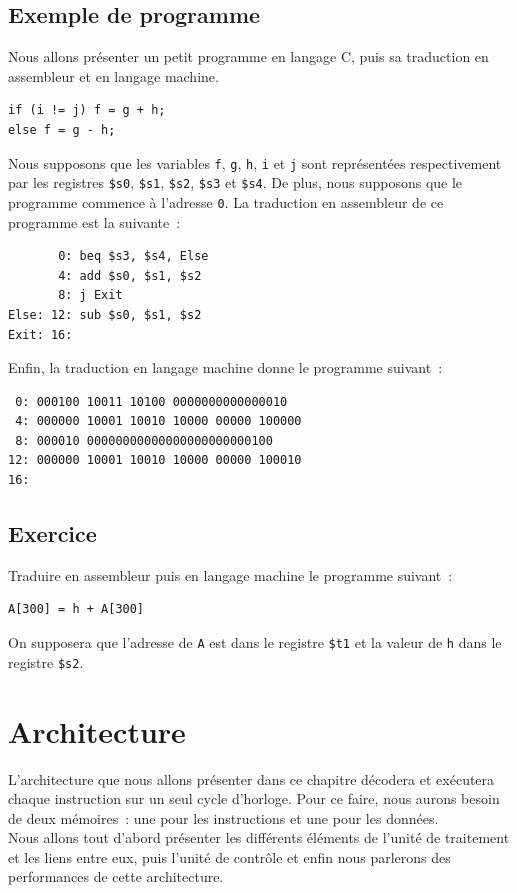 \documentclass[12pt]{article}
\begin{document}
\subsection{Exemple de programme}

Nous allons présenter un petit programme en langage C, puis sa traduction en assembleur et en langage machine.
\begin{verbatim}
if (i != j) f = g + h;
else f = g - h;
\end{verbatim}

Nous supposons que les variables \verb+f+, \verb+g+, \verb+h+, \verb+i+ et \verb+j+ sont représentées respectivement par les registres
\verb+$s0+, \verb+$s1+, \verb+$s2+, \verb+$s3+ et \verb+$s4+. De plus, nous supposons que le programme commence à l'adresse \verb+0+.
La traduction en assembleur de ce programme est la suivante~:

\begin{verbatim}
       0: beq $s3, $s4, Else
       4: add $s0, $s1, $s2
       8: j Exit
Else: 12: sub $s0, $s1, $s2
Exit: 16:
\end{verbatim}

Enfin, la traduction en langage machine donne le programme suivant~:

\begin{verbatim}
 0: 000100 10011 10100 0000000000000010
 4: 000000 10001 10010 10000 00000 100000
 8: 000010 00000000000000000000000100
12: 000000 10001 10010 10000 00000 100010
16:
\end{verbatim}

\subsection{Exercice}

Traduire en assembleur puis en langage machine le programme suivant~:

\begin{verbatim}
A[300] = h + A[300]
\end{verbatim}

On supposera que l'adresse de \verb+A+ est dans le registre \verb+$t1+ et la valeur de \verb+h+ dans le registre \verb+$s2+.

\section{Architecture}

L'architecture que nous allons présenter dans ce chapitre décodera et exécutera chaque instruction sur un seul cycle d'horloge. Pour ce
faire, nous aurons besoin de deux mémoires~: une pour les instructions et une pour les données.\\
Nous allons tout d'abord présenter les différents éléments de l'unité de traitement et les liens entre eux, puis l'unité de contrôle et
enfin nous parlerons des performances de cette architecture.
\end{document}
